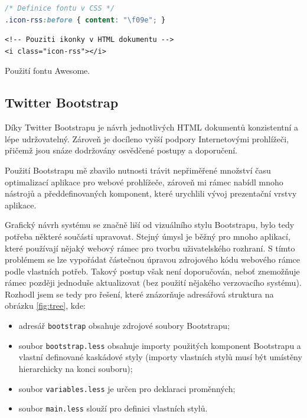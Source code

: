 \begin{demo}
    \centering
    \begin{lstlisting}[language=css]
/* Definice fontu v CSS */
.icon-rss:before { content: "\f09e"; }
    \end{lstlisting}
    \begin{lstlisting}[language=html5]
<!-- Pouziti ikonky v HTML dokumentu -->
<i class="icon-rss"></i>
    \end{lstlisting}
    \caption{Použití fontu Awesome.}
    \label{demo:awesome}
\end{demo}

\subsection{Twitter Bootstrap}

Díky Twitter Bootstrapu je návrh jednotlivých HTML dokumentů konzistentní a lépe udržovatelný. Zároveň je docíleno vyšší podpory Internetovými prohlížeči, přičemž jsou snáze dodržovány osvědčené postupy a doporučení.

Použití Bootstrapu mě zbavilo nutnosti trávit nepřiměřené množství času optimalizací aplikace pro webové prohlížeče, zároveň mi rámec nabídl mnoho nástrojů a předdefinovaných komponent, které urychlili vývoj prezentační vrstvy aplikace.

Grafický návrh systému se značně liší od vizuálního stylu Bootstrapu, bylo tedy potřeba některé součásti upravovat. Stejný úmysl je běžný pro mnoho aplikací, které používají nějaký webový rámec pro tvorbu uživatelského rozhraní. S tímto problémem se lze vypořádat částečnou úpravou zdrojového kódu webového rámce podle vlastních potřeb. Takový postup však není doporučován, neboť znemožňuje rámec později jednoduše aktualizovat (bez použití nějakého verzovacího systému). Rozhodl jsem se tedy pro řešení, které znázorňuje adresářová struktura na obrázku \ref{fig:tree}, kde:

\begin{itemize}
    \item adresář \texttt{bootstrap} obsahuje zdrojové soubory Bootstrapu;
    \item soubor \texttt{bootstrap.less} obsahuje importy použitých komponent Bootstrapu a vlastní definované kaskádové styly (importy vlastních stylů musí být umístěny hierarchicky na konci souboru);
    \item soubor \texttt{variables.less} je určen pro deklaraci proměnných;
    \item soubor \texttt{main.less} slouží pro definici vlastních stylů.
\end{itemize}


